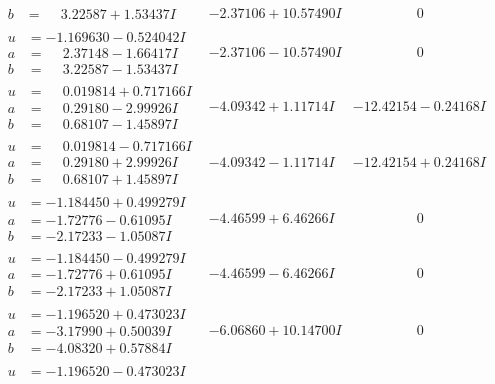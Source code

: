 \documentclass[1p]{elsarticle_modified}
\theoremstyle{definition}
\begin{document}
$$\begin{array}{c|c|c}
\begin{aligned}
b &= \phantom{-}3.22587 + 1.53437 I\end{aligned}
 & -2.37106 + 10.57490 I & \phantom{-0.000000 } 0 \\ \hline\begin{aligned}
u &= -1.169630 - 0.524042 I \\
a &= \phantom{-}2.37148 - 1.66417 I \\
b &= \phantom{-}3.22587 - 1.53437 I\end{aligned}
 & -2.37106 - 10.57490 I & \phantom{-0.000000 } 0 \\ \hline\begin{aligned}
u &= \phantom{-}0.019814 + 0.717166 I \\
a &= \phantom{-}0.29180 - 2.99926 I \\
b &= \phantom{-}0.68107 - 1.45897 I\end{aligned}
 & -4.09342 + 1.11714 I & -12.42154 - 0.24168 I \\ \hline\begin{aligned}
u &= \phantom{-}0.019814 - 0.717166 I \\
a &= \phantom{-}0.29180 + 2.99926 I \\
b &= \phantom{-}0.68107 + 1.45897 I\end{aligned}
 & -4.09342 - 1.11714 I & -12.42154 + 0.24168 I \\ \hline\begin{aligned}
u &= -1.184450 + 0.499279 I \\
a &= -1.72776 - 0.61095 I \\
b &= -2.17233 - 1.05087 I\end{aligned}
 & -4.46599 + 6.46266 I & \phantom{-0.000000 } 0 \\ \hline\begin{aligned}
u &= -1.184450 - 0.499279 I \\
a &= -1.72776 + 0.61095 I \\
b &= -2.17233 + 1.05087 I\end{aligned}
 & -4.46599 - 6.46266 I & \phantom{-0.000000 } 0 \\ \hline\begin{aligned}
u &= -1.196520 + 0.473023 I \\
a &= -3.17990 + 0.50039 I \\
b &= -4.08320 + 0.57884 I\end{aligned}
 & -6.06860 + 10.14700 I & \phantom{-0.000000 } 0 \\ \hline\begin{aligned}
u &= -1.196520 - 0.473023 I \\

\end{aligned}
\end{array}$$
\end{document}
